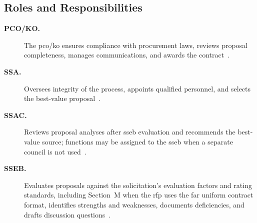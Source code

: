 \documentclass[../main.tex]{subfiles}
\begin{document}
\subsection{Roles and Responsibilities}
\begin{description}
  \item[\textbf{PCO/KO.}] The \ac{pco}/\ac{ko} ensures compliance with procurement laws, reviews proposal completeness, manages communications, and awards the contract~\autocite{edo-3-2-3-source-selection-2025,FAR-15-303-Responsibilities}.
  \item[\textbf{SSA.}] Oversees integrity of the process, appoints qualified personnel, and selects the best-value proposal~\autocite{edo-3-2-3-source-selection-2025,FAR-15-303-Responsibilities,FAR-15-308-Source-Selection-Decision}.
  \item[\textbf{SSAC.}] Reviews proposal analyses after \ac{sseb} evaluation and recommends the best-value source; functions may be assigned to the \ac{sseb} when a separate council is not used~\autocite{edo-3-2-3-source-selection-2025,DoD-Source-Selection-Procedures-2022}.
  \item[\textbf{SSEB.}] Evaluates proposals against the solicitation's evaluation factors and rating standards, including Section~M when the \ac{rfp} uses the \ac{far} uniform contract format, identifies strengths and weaknesses, documents deficiencies, and drafts discussion questions~\autocite{edo-3-2-3-source-selection-2025,DoD-Source-Selection-Procedures-2022,FAR-15-304-Evaluation-Factors,FAR-15-305-Proposal-Evaluation}.
\end{description}

\end{document}
